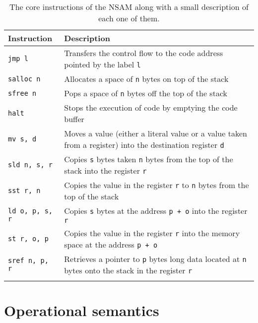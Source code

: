 \begin{longtable}[H]{p{}p{}}
  \toprule
  Instruction & Description \\
  \midrule \endhead
  \texttt{jmp l} & Transfers the control flow to the code address pointed by the label \texttt{l} \\
  \texttt{salloc n} & Allocates a space of \texttt{n} bytes on top of the stack \\
  \texttt{sfree n} & Pops a space of \texttt{n} bytes off the top of the stack \\
  \texttt{halt} & Stops the execution of code by emptying the code buffer \\
  \texttt{mv s, d} & Moves a value (either a literal value or a value taken from a register) into the destination register \texttt{d} \\
  \texttt{sld n, s, r} & Copies \texttt{s} bytes taken \texttt{n} bytes from the top of the stack into the register \texttt{r} \\
  \texttt{sst r, n} & Copies the value in the register \texttt{r} to \texttt{n} bytes from the top of the stack \\
  \texttt{ld o, p, s, r} & Copies \texttt{s} bytes at the address \texttt{p + o} into the register \texttt{r} \\
  \texttt{st r, o, p} & Copies the value in the register \texttt{r} into the memory space at the address \texttt{p + o} \\
  \texttt{sref n, p, r} & Retrieves a pointer to \texttt{p} bytes long data located at \texttt{n} bytes onto the stack in the register \texttt{r} \\
  \bottomrule

  \caption{The core instructions of the NSAM along with a small description of each one of them.}
  \label{fig:nstar-nsam-core-instructions}
\end{longtable}

\section{Operational semantics}\label{sec:nstar-nsam-opsem}

